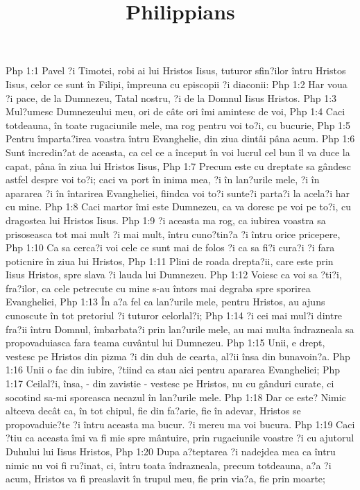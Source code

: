

\title{Philippians}

Php 1:1  Pavel ?i Timotei, robi ai lui Hristos Iisus, tuturor sfin?ilor întru Hristos Iisus, celor ce sunt în Filipi, împreuna cu episcopii ?i diaconii:
Php 1:2  Har voua ?i pace, de la Dumnezeu, Tatal nostru, ?i de la Domnul Iisus Hristos.
Php 1:3  Mul?umesc Dumnezeului meu, ori de câte ori îmi amintesc de voi,
Php 1:4  Caci totdeauna, în toate rugaciunile mele, ma rog pentru voi to?i, cu bucurie,
Php 1:5  Pentru împarta?irea voastra întru Evanghelie, din ziua dintâi pâna acum.
Php 1:6  Sunt încredin?at de aceasta, ca cel ce a început în voi lucrul cel bun îl va duce la capat, pâna în ziua lui Hristos Iisus,
Php 1:7  Precum este cu dreptate sa gândesc astfel despre voi to?i; caci va port în inima mea, ?i în lan?urile mele, ?i în apararea ?i în întarirea Evangheliei, fiindca voi to?i sunte?i parta?i la acela?i har cu mine.
Php 1:8  Caci martor îmi este Dumnezeu, ca va doresc pe voi pe to?i, cu dragostea lui Hristos Iisus.
Php 1:9  ?i aceasta ma rog, ca iubirea voastra sa prisoseasca tot mai mult ?i mai mult, întru cuno?tin?a ?i întru orice pricepere,
Php 1:10  Ca sa cerca?i voi cele ce sunt mai de folos ?i ca sa fi?i cura?i ?i fara poticnire în ziua lui Hristos,
Php 1:11  Plini de roada drepta?ii, care este prin Iisus Hristos, spre slava ?i lauda lui Dumnezeu.
Php 1:12  Voiesc ca voi sa ?ti?i, fra?ilor, ca cele petrecute cu mine s-au întors mai degraba spre sporirea Evangheliei,
Php 1:13  În a?a fel ca lan?urile mele, pentru Hristos, au ajuns cunoscute în tot pretoriul ?i tuturor celorlal?i;
Php 1:14  ?i cei mai mul?i dintre fra?ii întru Domnul, îmbarbata?i prin lan?urile mele, au mai multa îndrazneala sa propovaduiasca fara teama cuvântul lui Dumnezeu.
Php 1:15  Unii, e drept, vestesc pe Hristos din pizma ?i din duh de cearta, al?ii însa din bunavoin?a.
Php 1:16  Unii o fac din iubire, ?tiind ca stau aici pentru apararea Evangheliei;
Php 1:17  Ceilal?i, însa, - din zavistie - vestesc pe Hristos, nu cu gânduri curate, ci socotind sa-mi sporeasca necazul în lan?urile mele.
Php 1:18  Dar ce este? Nimic altceva decât ca, în tot chipul, fie din fa?arie, fie în adevar, Hristos se propovaduie?te ?i întru aceasta ma bucur. ?i mereu ma voi bucura.
Php 1:19  Caci ?tiu ca aceasta îmi va fi mie spre mântuire, prin rugaciunile voastre ?i cu ajutorul Duhului lui Iisus Hristos,
Php 1:20  Dupa a?teptarea ?i nadejdea mea ca întru nimic nu voi fi ru?inat, ci, întru toata îndrazneala, precum totdeauna, a?a ?i acum, Hristos va fi preaslavit în trupul meu, fie prin via?a, fie prin moarte;
